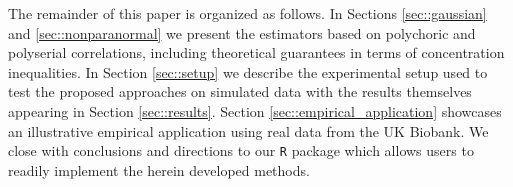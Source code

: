 The remainder of this paper is organized as follows. In Sections \ref{sec::gaussian} and \ref{sec::nonparanormal} we present the estimators based on polychoric and polyserial correlations, including theoretical guarantees in terms of concentration inequalities. In Section \ref{sec::setup} we describe the experimental setup used to test the proposed approaches on simulated data with the results themselves appearing in Section \ref{sec::results}. Section \ref{sec::empirical_application} showcases an illustrative empirical application using real data from the UK Biobank. We close with conclusions and directions to our \texttt{R} package  which allows users to readily implement the herein developed methods.


